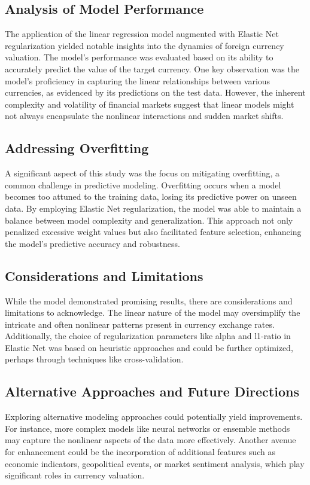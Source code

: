 \documentclass[conference]{IEEEtran}
\begin{document}
\subsection{Analysis of Model Performance}
The application of the linear regression model augmented with Elastic Net regularization yielded notable insights into the dynamics of foreign currency valuation. The model’s performance was evaluated based on its ability to accurately predict the value of the target currency. One key observation was the model's proficiency in capturing the linear relationships between various currencies, as evidenced by its predictions on the test data. However, the inherent complexity and volatility of financial markets suggest that linear models might not always encapsulate the nonlinear interactions and sudden market shifts.

\subsection{Addressing Overfitting}
A significant aspect of this study was the focus on mitigating overfitting, a common challenge in predictive modeling. Overfitting occurs when a model becomes too attuned to the training data, losing its predictive power on unseen data. By employing Elastic Net regularization, the model was able to maintain a balance between model complexity and generalization. This approach not only penalized excessive weight values but also facilitated feature selection, enhancing the model's predictive accuracy and robustness.

\subsection{Considerations and Limitations}
While the model demonstrated promising results, there are considerations and limitations to acknowledge. The linear nature of the model may oversimplify the intricate and often nonlinear patterns present in currency exchange rates. Additionally, the choice of regularization parameters like alpha and l1-ratio in Elastic Net was based on heuristic approaches and could be further optimized, perhaps through techniques like cross-validation.

\subsection{Alternative Approaches and Future Directions}
Exploring alternative modeling approaches could potentially yield improvements. For instance, more complex models like neural networks or ensemble methods may capture the nonlinear aspects of the data more effectively. Another avenue for enhancement could be the incorporation of additional features such as economic indicators, geopolitical events, or market sentiment analysis, which play significant roles in currency valuation.
\end{document}

